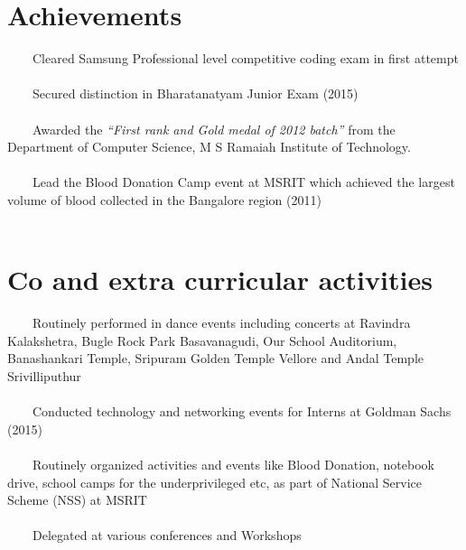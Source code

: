 \documentclass[a4paper,10pt]{article} %
\newcommand{\tabitem}{~~\llap{\textbullet}~~}
\begin{document}
\section{Achievements}
\tabitem Cleared Samsung Professional level competitive coding exam in first 
attempt \\
\\
\tabitem Secured distinction in Bharatanatyam Junior Exam (2015)  \\
\\
\tabitem Awarded the \textit{“First rank and Gold medal of 2012 batch”} from 
the Department of Computer Science, M S Ramaiah Institute of Technology.\\
\\
\tabitem Lead the Blood Donation Camp event at MSRIT which achieved the largest 
volume of blood collected in the Bangalore region (2011)\\
\\


\section{Co and extra curricular activities}
\tabitem Routinely performed in dance events including concerts at Ravindra 
Kalakshetra, Bugle Rock Park Basavanagudi, Our School Auditorium, Banashankari 
Temple, Sripuram Golden Temple Vellore and Andal Temple Srivilliputhur\\
\\
\tabitem Conducted technology and networking events for Interns at Goldman 
Sachs (2015)\\
\\
\tabitem Routinely organized activities and events like Blood Donation, 
notebook drive, school camps for the underprivileged etc, as part of National 
Service Scheme (NSS) at MSRIT\\
\\ 
\tabitem Delegated at various conferences and Workshops\\
\end{document}
